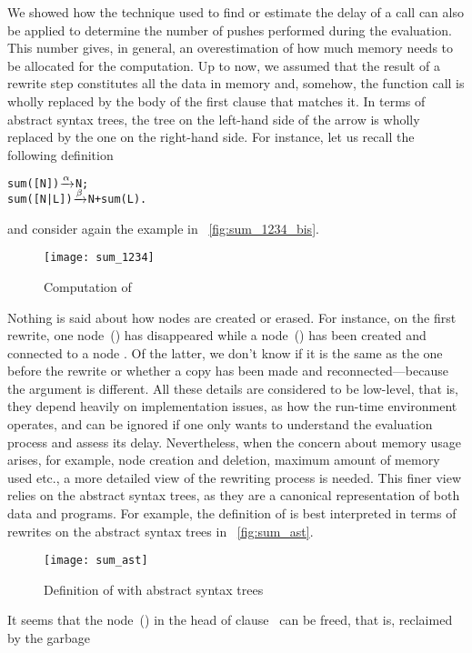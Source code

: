We showed  how the technique used to
find or estimate the delay of a call can also be applied to determine
the number of pushes performed during the evaluation. This number
gives, in general, an overestimation of how much memory needs to be
allocated for the computation. Up to now, we assumed that the result
of a rewrite step constitutes all the data in memory and, somehow, the
function call is wholly replaced by the body of the first clause that
matches it. In terms of abstract syntax trees, the tree on the
left\hyp{}hand side of the arrow is wholly replaced by the one on the
right\hyp{}hand side. For instance, let us recall the following
definition
\begin{alltt}
sum(  [N]) \(\smashedrightarrow{\alpha}\) N;
sum([N|L]) \(\smashedrightarrow{\beta}\) N + sum(L).
\end{alltt}
and consider again the example in \fig~\vref{fig:sum_1234_bis}.
\begin{figure}[t]
\centering
\texttt{[image: sum\_1234]}
\caption{Computation of \label{fig:sum_1234_bis}}
\end{figure}
Nothing is said about how nodes are created or erased. For instance,
on the first rewrite, one node~(\erlcode{|}) has disappeared while a
node~(\erlcode{+}) has been created and connected to a node
. Of the latter, we don't know if it is the same as the
one before the rewrite or whether a copy has been made and
reconnected---because the argument is different. All these details are
considered to be low\hyp{}level, that is, they depend heavily on
implementation issues, as how the run\hyp{}time environment operates,
and can be ignored if one only wants to understand the evaluation
process and assess its delay. Nevertheless, when the concern about
memory usage arises, for example, node creation and deletion, maximum
amount of memory used etc., a more detailed view of the rewriting
process is needed. This finer view relies on the abstract syntax
trees, as they are a canonical representation of both data and
programs. For example, the definition of  is best
interpreted in terms of rewrites on the abstract syntax trees in
\fig~\vref{fig:sum_ast}.
\begin{figure}[b]
\centering
\texttt{[image: sum\_ast]}
\caption{Definition of  with abstract syntax trees
\label{fig:sum_ast}}
\end{figure}
It seems that the node~(\erlcode{|}) in the head of
clause~\clause{\beta} can be freed, that is, reclaimed by the garbage
